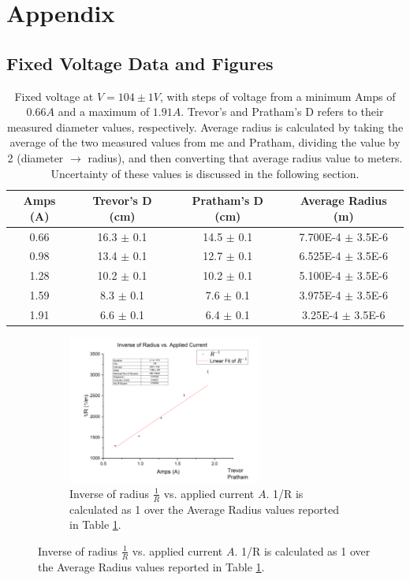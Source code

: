 \documentclass[12pt]{article}
\begin{document}
\clearpage
\appendix
\section{Appendix}
\subsection{Fixed Voltage Data and Figures}

\begin{table}[h]
    \centering
    \begin{tabular}{|c|c|c|c|}
        \hline
        Amps (A) & Trevor's D (cm) & Pratham's D (cm) & Average Radius (m) \\ 
        \hline
        0.66 & 16.3 $\pm$ 0.1 & 14.5 $\pm$ 0.1 & 7.700E-4 $\pm$ 3.5E-6 \\ 
        0.98 & 13.4 $\pm$ 0.1 & 12.7 $\pm$ 0.1 & 6.525E-4 $\pm$ 3.5E-6 \\ 
        1.28 & 10.2 $\pm$ 0.1 & 10.2 $\pm$ 0.1 & 5.100E-4 $\pm$ 3.5E-6 \\ 
        1.59 & 8.3 $\pm$ 0.1 & 7.6 $\pm$ 0.1 & 3.975E-4 $\pm$ 3.5E-6 \\
        1.91 & 6.6 $\pm$ 0.1 & 6.4 $\pm$ 0.1 & 3.25E-4 $\pm$ 3.5E-6 \\
        \hline
    \end{tabular}
    \caption{Fixed voltage at $V=104\pm1 V$, with steps of voltage from a minimum Amps of $0.66 A$ and a maximum of $1.91 A$. Trevor's and Pratham's D refers to their measured diameter values, respectively. Average radius is calculated by taking the average of the two measured values from me and Pratham, dividing the value by 2 (diameter $\to$ radius), and then converting that average radius value to meters. Uncertainty of these values is discussed in the following section.}
    \label{t_FixV}
\end{table}

\begin{figure} [h]
    \begin{subfigure}
        \centering
        \includegraphics[width=0.7\textwidth]{figures/EOM_Fix_Voltage.png}
        \caption{Inverse of radius $\frac{1}{R}$ vs. applied current $A$. 1/R is calculated as 1 over the Average Radius values reported in Table \ref{t_FixV}.}
        \label{p_FixV}
    \end{subfigure}
\end{figure}
\end{document}
